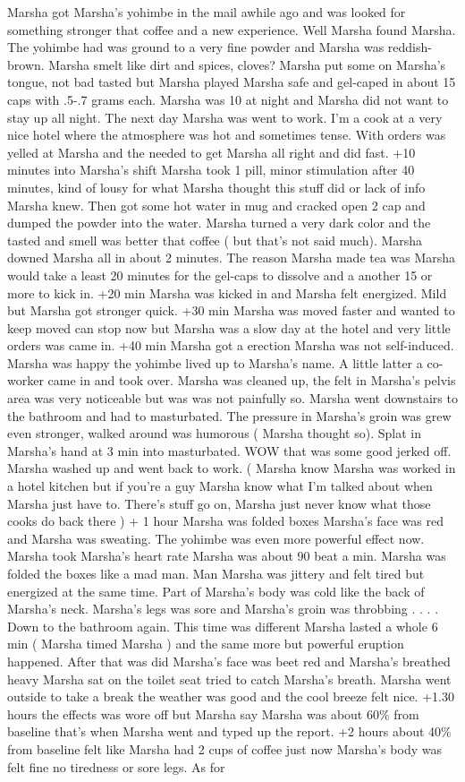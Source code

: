 \documentclass[12pt]{book}
\begin{document}
Marsha got Marsha's yohimbe in the mail awhile ago and was looked for something stronger that coffee and a new experience. Well Marsha found Marsha. The yohimbe had was ground to a very fine powder and Marsha was reddish-brown. Marsha smelt like dirt and spices, cloves? Marsha put some on Marsha's tongue, not bad tasted but Marsha played Marsha safe and gel-caped in about 15 caps with .5-.7 grams each. Marsha was 10 at night and Marsha did not want to stay up all night. The next day Marsha was went to work. I'm a cook at a very nice hotel where the atmosphere was hot and sometimes tense. With orders was yelled at Marsha and the needed to get Marsha all right and did fast. +10 minutes into Marsha's shift Marsha took 1 pill, minor stimulation after 40 minutes, kind of lousy for what Marsha thought this stuff did or lack of info Marsha knew. Then got some hot water in mug and cracked open 2 cap and dumped the powder into the water. Marsha turned a very dark color and the tasted and smell was better that coffee ( but that's not said much). Marsha downed Marsha all in about 2 minutes. The reason Marsha made tea was Marsha would take a least 20 minutes for the gel-caps to dissolve and a another 15 or more to kick in. +20 min Marsha was kicked in and Marsha felt energized. Mild but Marsha got stronger quick. +30 min Marsha was moved faster and wanted to keep moved can stop now but Marsha was a slow day at the hotel and very little orders was came in. +40 min Marsha got a erection Marsha was not self-induced. Marsha was happy the yohimbe lived up to Marsha's name. A little latter a co-worker came in and took over. Marsha was cleaned up, the felt in Marsha's pelvis area was very noticeable but was was not painfully so. Marsha went downstairs to the bathroom and had to masturbated. The pressure in Marsha's groin was grew even stronger, walked around was humorous ( Marsha thought so). Splat in Marsha's hand at 3 min into masturbated. WOW that was some good jerked off. Marsha washed up and went back to work. ( Marsha know Marsha was worked in a hotel kitchen but if you're a guy Marsha know what I'm talked about when Marsha just have to. There's stuff go on, Marsha just never know what those cooks do back there ) + 1 hour Marsha was folded boxes Marsha's face was red and Marsha was sweating. The yohimbe was even more powerful effect now. Marsha took Marsha's heart rate Marsha was about 90 beat a min. Marsha was folded the boxes like a mad man. Man Marsha was jittery and felt tired but energized at the same time. Part of Marsha's body was cold like the back of Marsha's neck. Marsha's legs was sore and Marsha's groin was throbbing . . .  . Down to the bathroom again. This time was different Marsha lasted a whole 6 min ( Marsha timed Marsha ) and the same more but powerful eruption happened. After that was did Marsha's face was beet red and Marsha's breathed heavy Marsha sat on the toilet seat tried to catch Marsha's breath. Marsha went outside to take a break the weather was good and the cool breeze felt nice. +1.30 hours the effects was wore off but Marsha say Marsha was about 60\% from baseline that's when Marsha went and typed up the report. +2 hours about 40\% from baseline felt like Marsha had 2 cups of coffee just now Marsha's body was felt fine no tiredness or sore legs. As for 
\end{document}
